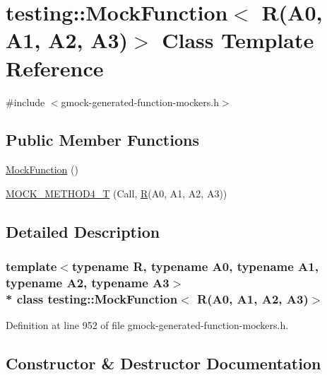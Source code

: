 \hypertarget{classtesting_1_1_mock_function_3_01_r_07_a0_00_01_a1_00_01_a2_00_01_a3_08_4}{}\section{testing\+:\+:Mock\+Function$<$ R(A0, A1, A2, A3)$>$ Class Template Reference}
\label{classtesting_1_1_mock_function_3_01_r_07_a0_00_01_a1_00_01_a2_00_01_a3_08_4}


{\ttfamily \#include $<$gmock-\/generated-\/function-\/mockers.\+h$>$}

\subsection*{Public Member Functions}
\begin{DoxyCompactItemize}
\item 
\hyperlink{classtesting_1_1_mock_function_3_01_r_07_a0_00_01_a1_00_01_a2_00_01_a3_08_4_abf2185b2c08c575374074520778f574a}{Mock\+Function} ()
\item 
\hyperlink{classtesting_1_1_mock_function_3_01_r_07_a0_00_01_a1_00_01_a2_00_01_a3_08_4_ad158c25a1b33cb53bae3f0eb9df0d59c}{M\+O\+C\+K\+\_\+\+M\+E\+T\+H\+O\+D4\+\_\+T} (Call, \hyperlink{typedefs__9_8js_afb423b73ee7b6c04d2d54fc06e405404}{R}(A0, A1, A2, A3))
\end{DoxyCompactItemize}


\subsection{Detailed Description}
\subsubsection*{template$<$typename R, typename A0, typename A1, typename A2, typename A3$>$\\*
class testing\+::\+Mock\+Function$<$ R(\+A0, A1, A2, A3)$>$}



Definition at line 952 of file gmock-\/generated-\/function-\/mockers.\+h.



\subsection{Constructor \& Destructor Documentation}
